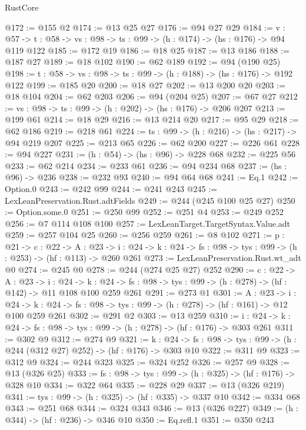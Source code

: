 \begin{lexlean}{RustCore}
\begin{coremodule}
@172 := @155 @2
@174 := @13 @25 @27
@176 := @94 @27 @29
@184 := {v : @57} ->
  {t : @58} -> {vs : @98} -> {ts : @99} -> (h : @174) -> (hs : @176) -> @94 @119 @122
@185 := @172 @19
@186 := @18 @25
@187 := @13 @186
@188 := @187 @27
@189 := @18 @102
@190 := @62 @189
@192 := @94 (@190 @25)
@198 := {t : @58} -> {vs : @98} -> {ts : @99} -> (h : @188) -> (hs : @176) -> @192 @122
@199 := @185 @20
@200 := @18 @27
@202 := @13 @200 @20
@203 := @18 @104
@204 := @62 @203
@206 := @94 (@204 @25)
@207 := @67 @27
@212 := {vs : @98} -> {ts : @99} -> (h : @202) -> (hs : @176) -> @206 @207
@213 := @199 @61
@214 := @18 @29
@216 := @13 @214 @20
@217 := @95 @29
@218 := @62 @186
@219 := @218 @61
@224 := {ts : @99} -> (h : @216) -> (hs : @217) -> @94 @219 @207
@225 := @213 @65
@226 := @62 @200
@227 := @226 @61
@228 := @94 @227
@231 := (h : @54) -> (hs : @96) -> @228 @68
@232 := @225 @56
@233 := @62 @214
@234 := @233 @61
@236 := @94 @234 @68
@237 := (hs : @96) -> @236
@238 := @232 @93
@240 := @94 @64 @68
@241 := Eq.{1}
@242 := Option.{0}
@243 := @242 @99
@244 := @241 @243
@245 := LexLeanPreservation.Rust.adtFields
@249 := @244 (@245 @100 @25 @27)
@250 := Option.some.{0}
@251 := @250 @99
@252 := @251 @4
@253 := @249 @252
@256 := @7 @114 @108 @100
@257 := LexLeanTarget.TargetSyntax.Value.adt
@259 := @257 @104 @25
@260 := @256 @259
@261 := @8 @102
@271 := {p : @21} ->
  {c : @22} ->
  {A : @23} ->
  {i : @24} -> {k : @24} -> {fs : @98} -> {tys : @99} -> (h : @253) -> (hf : @113) -> @260 @261
@273 := LexLeanPreservation.Rust.wt_adt @0
@274 := @245 @0
@278 := @244 (@274 @25 @27) @252
@290 := {c : @22} ->
  {A : @23} ->
  {i : @24} ->
  {k : @24} -> {fs : @98} -> {tys : @99} -> (h : @278) -> (hf : @142) -> @11 @108 @100 @259 @261
@291 := @273 @1
@301 := {A : @23} ->
  {i : @24} ->
  {k : @24} -> {fs : @98} -> {tys : @99} -> (h : @278) -> (hf : @161) -> @12 @100 @259 @261
@302 := @291 @2
@303 := @13 @259
@310 := {i : @24} ->
  {k : @24} -> {fs : @98} -> {tys : @99} -> (h : @278) -> (hf : @176) -> @303 @261
@311 := @302 @9
@312 := @274 @9
@321 := {k : @24} ->
  {fs : @98} -> {tys : @99} -> (h : @244 (@312 @27) @252) -> (hf : @176) -> @303 @10
@322 := @311 @9
@323 := @312 @9
@324 := @244 @323
@325 := @324 @252
@326 := @257 @9
@328 := @13 (@326 @25)
@333 := {fs : @98} -> {tys : @99} -> (h : @325) -> (hf : @176) -> @328 @10
@334 := @322 @64
@335 := @228 @29
@337 := @13 (@326 @219)
@341 := {tys : @99} -> (h : @325) -> (hf : @335) -> @337 @10
@342 := @334 @68
@343 := @251 @68
@344 := @324 @343
@346 := @13 (@326 @227)
@349 := (h : @344) -> (hf : @236) -> @346 @10
@350 := Eq.refl.{1}
@351 := @350 @243

\end{coremodule}
\end{lexlean}
